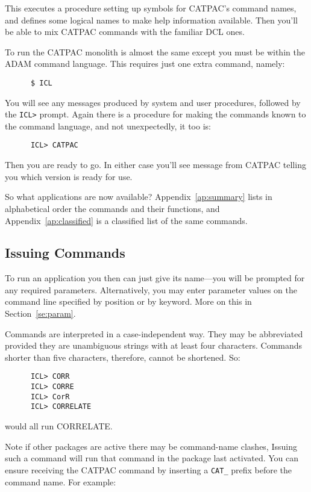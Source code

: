 This executes a procedure setting up symbols for {\small CATPAC}'s command
names, and defines some logical names to make help information available. Then
you'll be able to mix {\small CATPAC} commands with the familiar {\small DCL}
ones.

To run the {\small CATPAC} monolith is almost the same except you must be
within the {\small ADAM} command language. This requires just one extra
command, namely:

\begin{verbatim}
      $ ICL
\end{verbatim}

You will see any messages produced by system and user procedures, followed by
the {\tt ICL>} prompt. Again there is a procedure for making the commands known
to the command language, and not unexpectedly, it too is:

\begin{verbatim}
      ICL> CATPAC
\end{verbatim}

Then you are ready to go.  In either case  you'll see message from CATPAC
telling you which version is ready for use.

So what applications are now available?  Appendix~\ref{ap:summary} lists
in alphabetical order the commands and their functions, and
Appendix~\ref{ap:classified} is a classified list of the same commands. 

\subsection{Issuing Commands}

To run an application you then can just give its name---you will be
prompted for any required parameters. Alternatively, you may enter
parameter values on the command line specified by position or by
keyword.  More on this in Section~\ref{se:param}.

Commands are interpreted in a case-independent way.
They may be abbreviated provided they are unambiguous strings with
at least four characters.  Commands shorter than five characters,
therefore, cannot be shortened. So:
\begin{verbatim}
      ICL> CORR
      ICL> CORRE
      ICL> CorR
      ICL> CORRELATE
\end{verbatim}
would all run CORRELATE.

Note if other packages are active there may be command-name clashes, Issuing
such a command will run that command in the package last activated.  You can
ensure receiving the {\small CATPAC} command by inserting a {\tt CAT\_} prefix
before the command name.  For example:

